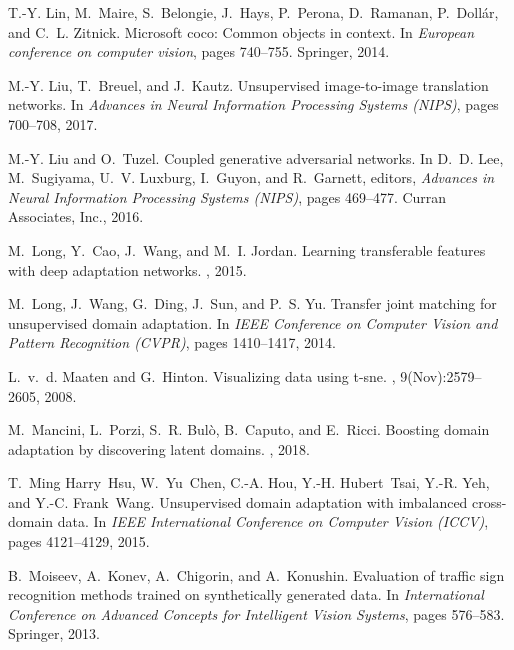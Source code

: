 \documentclass[10pt,letterpaper]{article}
\begin{document}
\begin{thebibliography}{10}
T.-Y. Lin, M.~Maire, S.~Belongie, J.~Hays, P.~Perona, D.~Ramanan,
  P.~Doll{\'a}r, and C.~L. Zitnick.
\newblock Microsoft coco: Common objects in context.
\newblock In {\em European conference on computer vision}, pages 740--755.
  Springer, 2014.

M.-Y. Liu, T.~Breuel, and J.~Kautz.
\newblock Unsupervised image-to-image translation networks.
\newblock In {\em Advances in Neural Information Processing Systems (NIPS)},
  pages 700--708, 2017.

M.-Y. Liu and O.~Tuzel.
\newblock Coupled generative adversarial networks.
\newblock In D.~D. Lee, M.~Sugiyama, U.~V. Luxburg, I.~Guyon, and R.~Garnett,
  editors, {\em Advances in Neural Information Processing Systems (NIPS)},
  pages 469--477. Curran Associates, Inc., 2016.

M.~Long, Y.~Cao, J.~Wang, and M.~I. Jordan.
\newblock Learning transferable features with deep adaptation networks.
, 2015.

M.~Long, J.~Wang, G.~Ding, J.~Sun, and P.~S. Yu.
\newblock Transfer joint matching for unsupervised domain adaptation.
\newblock In {\em IEEE Conference on Computer Vision and Pattern Recognition
  (CVPR)}, pages 1410--1417, 2014.

L.~v.~d. Maaten and G.~Hinton.
\newblock Visualizing data using t-sne.
, 9(Nov):2579--2605, 2008.

M.~Mancini, L.~Porzi, S.~R. Bul{\`o}, B.~Caputo, and E.~Ricci.
\newblock Boosting domain adaptation by discovering latent domains.
, 2018.

T.~Ming Harry~Hsu, W.~Yu~Chen, C.-A. Hou, Y.-H. Hubert~Tsai, Y.-R. Yeh, and
  Y.-C. Frank~Wang.
\newblock Unsupervised domain adaptation with imbalanced cross-domain data.
\newblock In {\em IEEE International Conference on Computer Vision (ICCV)},
  pages 4121--4129, 2015.

B.~Moiseev, A.~Konev, A.~Chigorin, and A.~Konushin.
\newblock Evaluation of traffic sign recognition methods trained on
  synthetically generated data.
\newblock In {\em International Conference on Advanced Concepts for Intelligent
  Vision Systems}, pages 576--583. Springer, 2013.


\end{thebibliography}
\end{document}
